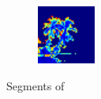 \begin{figure}
\begin{subfigure}{0.31\textwidth}
    \end{subfigure}
    \hspace*{\fill}
    \begin{subfigure}{0.31\textwidth}
        \includegraphics[width=\textwidth]{figures/PosDream.pdf}
    \end{subfigure}
\caption{Segments of }
\label{fig:dream_solution}
\end{figure}

